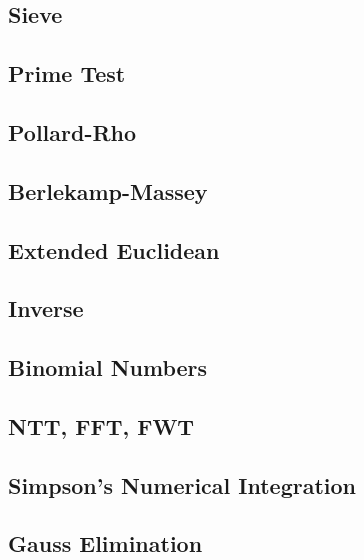 \subsection{Sieve}
\raggedbottom
\hrulefill
\subsection{Prime Test}
\raggedbottom
\hrulefill
\subsection{Pollard-Rho}
\raggedbottom
\hrulefill
\subsection{Berlekamp-Massey}
\raggedbottom
\hrulefill
\subsection{Extended Euclidean}
\raggedbottom
\hrulefill
\subsection{Inverse}
\raggedbottom
\hrulefill
\subsection{Binomial Numbers}
\raggedbottom
\hrulefill
\subsection{NTT, FFT, FWT}
\raggedbottom
\hrulefill
\subsection{Simpson's Numerical Integration}
\raggedbottom
\hrulefill
\subsection{Gauss Elimination}
\raggedbottom
\hrulefill
